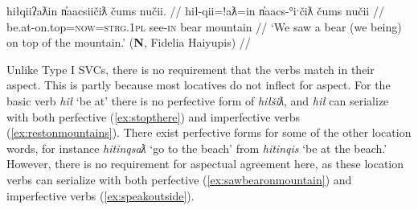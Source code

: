 \ex \label{ex:sawbearonmountain}
\begingl
\glpreamble hiłqiiʔaƛin n̓aacsiičiƛ čums nučii. //
\gla hił-qii=!aƛ=in n̓aacs-°iˑčiƛ čums nučii //
\glb be.at-on.top=\textsc{now}=\textsc{strg.1pl} see-\textsc{in} bear mountain //
\glft `We saw a bear (we being) on top of the mountain.' (\textbf{N}, Fidelia Haiyupis) //
\endgl
\xe

\begin{comment}
\ex~ \label{ex:hiddeninthewall}
\begingl
\glpreamble huptsaapckʷaƛ hinałc̓ił ʔiiḥmisukʔi p̓atquk. //
\gla hupt-saˑp=ckʷiˑ=!aƛ hina-ałc̓ił ʔiiḥmis=uk=ʔiˑ p̓atquk //
\glb hide-\textsc{mo.caus}=remains.of=\textsc{now} \textsc{empty}-in.wall important=\textsc{poss}=\textsc{art} belongings //
\glft `They hid their belongings in the walls.' (\textbf{B}, Bob Mundy) //
\endgl
\xe
\end{comment}

\begin{comment}
This ``interruption" can occur the other way around, when the location word is intransitive.

\ex \label{ex:gasolinebydoor}
\begingl
\glpreamble ḥuqšiƛ ʔucačiƛ ḥaa yaqʔiitq hiiłsʔat̓uus gasoline.\footnotemark //
\gla ḥuq-šiƛ ʔu-ca-čiƛ ḥaa yaq=ʔiˑtq hił-L.sʔat̓uus gasoline //
\glb tip.over-\textsc{mo} \textsc{x}-go-\textsc{mo} who.what=\textsc{defn.3} be.at-by.the.door gasoline //
\glft `It knocked the gasoline over toward the door..' (\textbf{C}, \textit{tupaat} Julia Lucas) //
\endgl
\xe

\footnotetext{In this dependent construction, `gasoline' is the participant of the predicative relativizer \textit{yaq} `who'. The bracketing is [ḥuqšiƛ ʔucačiƛ]\textsubscript{pred} [ḥaa [yaqʔiitq hiiłsʔat̓uus gasoline] ]\textsubscript{part}}
\end{comment}

Unlike Type I SVCs, there is no requirement that the verbs match in their aspect. This is partly because most locatives do not inflect for aspect. For the basic verb \textit{hił} `be at' there is no perfective form of \textit{hiłšiƛ}, and \textit{hił} can serialize with both perfective (\ref{ex:stopthere}) and imperfective verbs (\ref{ex:restonmountains}). There exist perfective forms for some of the other location words, for instance \textit{hitinqsaƛ} `go to the beach' from \textit{hitinqis} `be at the beach.' However, there is no requirement for aspectual agreement here, as these location verbs can serialize with both perfective (\ref{ex:sawbearonmountain}) and imperfective verbs (\ref{ex:speakoutside}).

